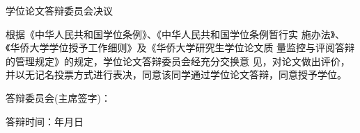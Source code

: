 {
    \begin{center}
        \sffamily\fontsize{16pt}{25pt}\selectfont 学\hspace{8pt}位\hspace{8pt}论\hspace{8pt}文\hspace{8pt}答\hspace{8pt}辩\hspace{8pt}委\hspace{8pt}员\hspace{8pt}会\hspace{8pt}决\hspace{8pt}议
    \end{center}
} \vspace{32pt}
{
    \fontsize{14pt}{26pt}\selectfont
    \noindent\hspace{28pt}\rmfamily 根据《中华人民共和国学位条例》、《中华人民共和国学位条例暂行实 施办法》、《华侨大学学位授予工作细则》及《华侨大学研究生学位论文质 量监控与评阅答辩的管理规定》的规定，学位论文答辩委员会经充分交换意 见，对论文做出评价，并以无记名投票方式进行表决，同意该同学通过\degree 学位论文答辩，同意授予\degree 学位。\par
    \vspace{192pt}
    \noindent\flushright 答辩委员会(主席签字)：\underline{\hspace{156pt}}\vspace{14pt} \par
    \noindent\flushright 答辩时间：\underline{\hspace{60pt}}年\underline{\hspace{25pt}}月\underline{\hspace{25pt}}日 \par
}
